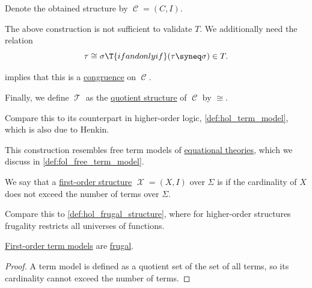 \begin{definition}
\begin{thmenum}
    Denote the obtained structure by \( \mscrC = (C, I) \).

     The above construction is not sufficient to validate \( T \). We additionally need the relation
    \begin{equation*}
      \tau \cong \sigma \T{if and only if} (\tau \syneq \sigma) \in T.
    \end{equation*}

     implies that this is a \hyperref[def:fol_congruence]{congruence} on \( \mscrC \).

     Finally, we define \( \mscrT \) as the \hyperref[def:fol_quotient_structure]{quotient structure} of \( \mscrC \) by \( {\cong} \).
  \end{thmenum}
\end{definition}
\begin{comments}
  \item Compare this to its counterpart in higher-order logic, \cref{def:hol_term_model}, which is also due to Henkin.

  \item This construction resembles free term models of \hyperref[def:fol_equational_theory]{equational theories}, which we discuss in \cref{def:fol_free_term_model}.
\end{comments}

\begin{definition}\label{def:fol_frugal_structure}
  We say that a \hyperref[def:fol_structure]{first-order structure} \( \mscrX = (X, I) \) over \( \Sigma \) is  if the cardinality of \( X \) does not exceed the number of terms over \( \Sigma \).
\end{definition}
\begin{comments}
  \item Compare this to \cref{def:hol_frugal_structure}, where for higher-order structures frugality restricts all universes of functions.
\end{comments}

\begin{proposition}\label{thm:fol_term_model_is_frugal}
  \hyperref[def:fol_term_model]{First-order term models} are \hyperref[def:fol_frugal_structure]{frugal}.
\end{proposition}
\begin{proof}
  A term model is defined as a quotient set of the set of all terms, so its cardinality cannot exceed the number of terms.
\end{proof}

